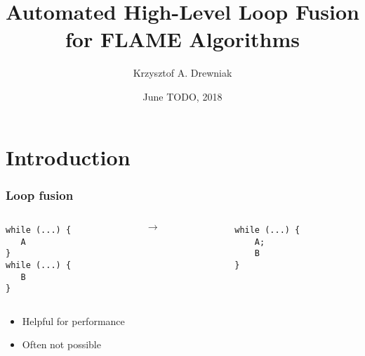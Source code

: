 \documentclass{beamer}
\title[Loop fusion]{Automated High-Level Loop Fusion for FLAME Algorithms}
\author[Drewniak]{Krzysztof A. Drewniak}
\institute[CMU]{Carnegie Mellon University}
\date[]{June TODO, 2018}
\begin{document}
\begin{frame}[plain]
  \titlepage{}
\end{frame}

\section{Introduction}

\begin{frame}[fragile]
  \frametitle{Loop fusion}
  \begin{columns}
    \begin{column}{0.45\textwidth}
\begin{verbatim}
while (...) {
   A
}
while (...) {
   B
}
\end{verbatim}
    \end{column}
    \begin{column}{0.1\textwidth}
      {\Large $\to$}
    \end{column}
    \begin{column}{0.45\textwidth}
\begin{verbatim}
while (...) {
    A;
    B
}
\end{verbatim}
    \end{column}
  \end{columns}

  \vspace*{2em}
  \begin{itemize}
  \item Helpful for performance
  \item Often not possible
  \end{itemize}
\end{frame}
\end{document}
